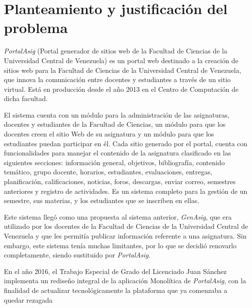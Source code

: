 \chapter{Planteamiento y justificación del problema}

    \textit{PortalAsig} (Portal generador de sitios web de la Facultad de Ciencias de la Universidad Central de Venezuela) es un portal web destinado a la creación de sitios web para la Facultad de Ciencias de la Universidad Central de Venezuela, que innova la comunicación entre docentes y estudiantes a través de un sitio virtual. Está en producción desde el año 2013 en el Centro de Computación de dicha facultad. 

    El sistema cuenta con un módulo para la administración de las asignaturas, docentes y estudiantes de la Facultad de Ciencias, un módulo para que los docentes creen el sitio Web de su asignatura y un módulo para que los estudiantes puedan participar en él. Cada sitio generado por el portal, cuenta con funcionalidades para manejar el contenido de la asignatura clasificado en las siguientes secciones: información general, objetivos, bibliografía, contenido temático, grupo docente, horarios, estudiantes, evaluaciones, entregas, planificación, calificaciones, noticias, foros, descargas, enviar correo, semestres anteriores y registro de actividades. Es un sistema completo para la gestión de un semestre, sus materias, y los estudiantes que se inscriben en ellas.

    Este sistema llegó como una propuesta al sistema anterior, \textit{GenAsig}, que era utilizado por los docentes de la Facultad de Ciencias de la Universidad Central de Venezuela y que les permitía publicar información referente a una asignatura. Sin embargo, este sistema tenía muchas limitantes, por lo que se decidió renovarlo completamente, siendo sustituido por \textit{PortalAsig}. \cite{portalasig_1}

    En el año 2016, el Trabajo Especial de Grado del Licenciado Juan Sánchez implementa un rediseño integral de la aplicación Monolítica de \textit{PortalAsig}, con la finalidad de actualizar tecnológicamente la plataforma que ya comenzaba a quedar rezagada

